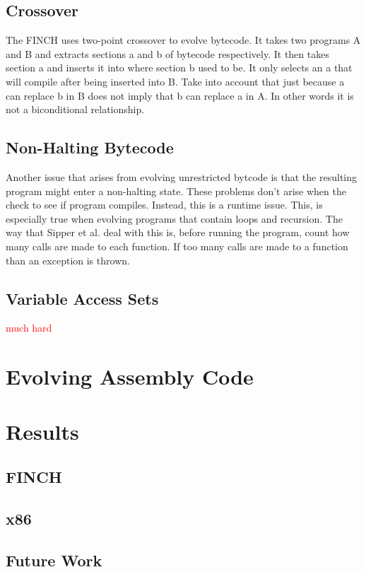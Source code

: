 \documentclass{sig-alternate}
\newcommand{\mycomment}[1]{\textcolor{red}{#1}}
\begin{document}
\subsection{Crossover}


The FINCH uses two-point crossover to evolve bytecode. It takes two programs A and B and extracts sections a and b of bytecode respectively. It then takes section a and inserts it into where section b used to be. It only selects an a that will compile after being inserted into B. Take into account that just because a can replace b in B does not imply that b can replace a in A. In other words it is not a biconditional relationship.

\subsection{Non-Halting Bytecode}
Another issue that arises from evolving unrestricted bytcode is that the resulting program might enter a non-halting state. These problems don't arise when the check to see if program compiles. Instead, this is a runtime issue. This, is especially true when evolving programs that contain loops and recursion.
The way that Sipper et al.\cite{FINCH:2011} deal with this is, before running the program, count how many calls are made to each function. If too many calls are made to a function than an exception is thrown.




\subsection{Variable Access Sets}
\cite{FINCH2:2009} \mycomment{much hard}


\section{Evolving Assembly Code}

\section{Results}
\subsection{FINCH}
\subsection{x86}

\subsection{Future Work}
\end{document}
